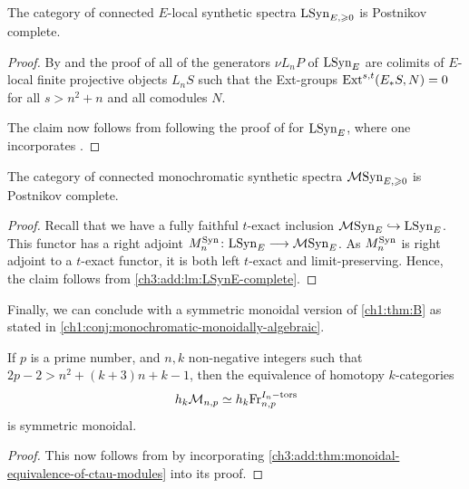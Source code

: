\begin{lemma}
    \label{ch3:add:lm:LSynE-complete}
    The category of connected $E$-local synthetic spectra $\mathrm{LSyn}_{E, \geqslant 0}$ is Postnikov complete.  
\end{lemma}
\begin{proof}
    By \cite[7.3]{pstragowski_vankoughnett_2022} and the proof of \cite[7.2]{pstragowski_vankoughnett_2022} all of the generators $\nu L_n P$ of $\mathrm{LSyn}_{E}$ are colimits of $E$-local finite projective objects $L_n S$ such that the Ext-groups $\operatorname{Ext}^{s,t}(E_* S, N) = 0$ for all $s>n^2+n$ and all comodules $N$. 

    The claim now follows from following the proof of \cite[7.4]{pstragowski_vankoughnett_2022} for $\mathrm{LSyn}_{E}$, where one incorporates \cite[6.10]{hovey_04}. 
\end{proof}

\begin{corollary}
    The category of connected monochromatic synthetic spectra $\mathcal{M}\mathrm{Syn}_{E, \geqslant 0}$ is Postnikov complete. 
\end{corollary}
\begin{proof}
    Recall that we have a fully faithful $t$-exact inclusion $\mathcal{M}\mathrm{Syn}_{E} \hookrightarrow \mathrm{LSyn}_{E}$. This functor has a right adjoint $M_n^{\mathrm{Syn}} \colon \mathrm{LSyn}_{E} \longrightarrow \mathcal{M}\mathrm{Syn}_{E}$. As $M_n^{\mathrm{Syn}}$ is right adjoint to a $t$-exact functor, it is both left $t$-exact and limit-preserving. Hence, the claim follows from \cref{ch3:add:lm:LSynE-complete}.
\end{proof}

Finally, we can conclude with a symmetric monoidal version of \cref{ch1:thm:B} as stated in \cref{ch1:conj:monochromatic-monoidally-algebraic}. 

\begin{theorem}
    \label{ch3:add:thm:monochromatic-monoidally-algebraic}
    If $p$ is a prime number, and $n, k$ non-negative integers such that $2p-2>n^2+(k+3)n+k-1$, then the equivalence of homotopy $k$-categories
    \[h_k \mathcal{M}_{n,p}\simeq h_k \mathrm{Fr}_{n,p}^{I_n-\mathrm{tors}}\]
    is symmetric monoidal. 
\end{theorem}
\begin{proof}
    This now follows from \cite[Theorem H]{barkan_2023} by incorporating \cref{ch3:add:thm:monoidal-equivalence-of-ctau-modules} into its proof. 
\end{proof}


